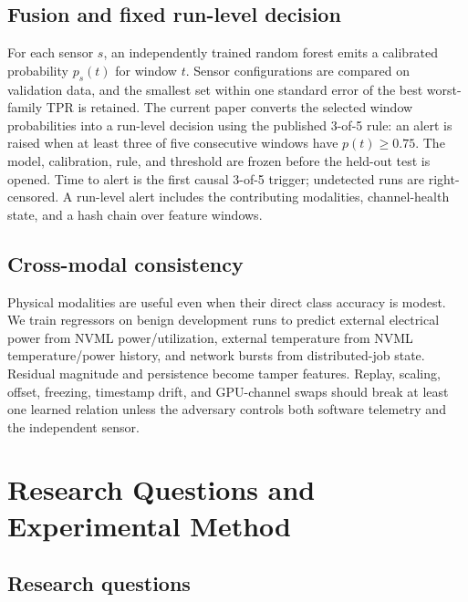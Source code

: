 \documentclass[sigplan,anonymous,review,nonacm]{acmart}
\begin{document}
\subsection{Fusion and fixed run-level decision}

For each sensor $s$, an independently trained random forest emits a calibrated probability $p_s(t)$ for window $t$. Sensor configurations are compared on validation data, and the smallest set within one standard error of the best worst-family TPR is retained. The current paper converts the selected window probabilities into a run-level decision using the published 3-of-5 rule: an alert is raised when at least three of five consecutive windows have $p(t)\geq0.75$. The model, calibration, rule, and threshold are frozen before the held-out test is opened. Time to alert is the first causal 3-of-5 trigger; undetected runs are right-censored. A run-level alert includes the contributing modalities, channel-health state, and a hash chain over feature windows.

\subsection{Cross-modal consistency}

Physical modalities are useful even when their direct class accuracy is modest. We train regressors on benign development runs to predict external electrical power from NVML power/utilization, external temperature from NVML temperature/power history, and network bursts from distributed-job state. Residual magnitude and persistence become tamper features. Replay, scaling, offset, freezing, timestamp drift, and GPU-channel swaps should break at least one learned relation unless the adversary controls both software telemetry and the independent sensor.

\section{Research Questions and Experimental Method}
\label{sec:rq}

\subsection{Research questions}
\end{document}

